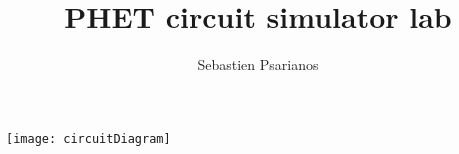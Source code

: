 \documentclass{article}
\begin{document}
\title{PHET circuit simulator lab}
\author{Sebastien Psarianos}

\texttt{[image: circuitDiagram]}
\end{document}
